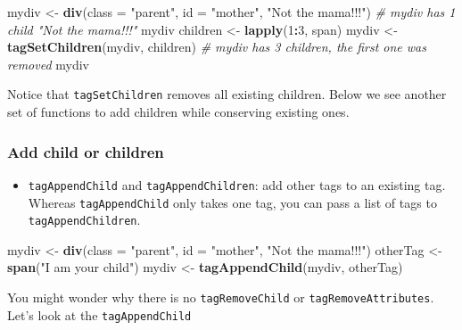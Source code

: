 \documentclass[
]{book}
\newenvironment{Shaded}{\begin{snugshade}}{\end{snugshade}}
\newcommand{\CommentTok}[1]{\textcolor[rgb]{0.56,0.35,0.01}{\textit{#1}}}
\newcommand{\DataTypeTok}[1]{\textcolor[rgb]{0.13,0.29,0.53}{#1}}
\newcommand{\DecValTok}[1]{\textcolor[rgb]{0.00,0.00,0.81}{#1}}
\newcommand{\KeywordTok}[1]{\textcolor[rgb]{0.13,0.29,0.53}{\textbf{#1}}}
\newcommand{\NormalTok}[1]{#1}
\newcommand{\OperatorTok}[1]{\textcolor[rgb]{0.81,0.36,0.00}{\textbf{#1}}}
\newcommand{\StringTok}[1]{\textcolor[rgb]{0.31,0.60,0.02}{#1}}
\providecommand{\tightlist}{%
  \setlength{\itemsep}{0pt}\setlength{\parskip}{0pt}}
\begin{document}
\begin{Shaded}
\begin{Highlighting}[]
\NormalTok{mydiv <-}\StringTok{ }\KeywordTok{div}\NormalTok{(}\DataTypeTok{class =} \StringTok{"parent"}\NormalTok{, }\DataTypeTok{id =} \StringTok{"mother"}\NormalTok{, }\StringTok{"Not the mama!!!"}\NormalTok{)}
\CommentTok{# mydiv has 1 child "Not the mama!!!"}
\NormalTok{mydiv }
\NormalTok{children <-}\StringTok{ }\KeywordTok{lapply}\NormalTok{(}\DecValTok{1}\OperatorTok{:}\DecValTok{3}\NormalTok{, span)}
\NormalTok{mydiv <-}\StringTok{ }\KeywordTok{tagSetChildren}\NormalTok{(mydiv, children)}
\CommentTok{# mydiv has 3 children, the first one was removed}
\NormalTok{mydiv }
\end{Highlighting}
\end{Shaded}

Notice that \texttt{tagSetChildren} removes all existing children. Below we see another set of functions to add children while conserving existing ones.

\hypertarget{add-child-or-children}{%
\subsubsection{Add child or children}\label{add-child-or-children}}

\begin{itemize}
\tightlist
\item
  \texttt{tagAppendChild} and \texttt{tagAppendChildren}: add other tags to an existing tag.
  Whereas \texttt{tagAppendChild} only takes one tag, you can pass a list of tags to \texttt{tagAppendChildren}.
\end{itemize}

\begin{Shaded}
\begin{Highlighting}[]
\NormalTok{mydiv <-}\StringTok{ }\KeywordTok{div}\NormalTok{(}\DataTypeTok{class =} \StringTok{"parent"}\NormalTok{, }\DataTypeTok{id =} \StringTok{"mother"}\NormalTok{, }\StringTok{"Not the mama!!!"}\NormalTok{)}
\NormalTok{otherTag <-}\StringTok{ }\KeywordTok{span}\NormalTok{(}\StringTok{"I am your child"}\NormalTok{)}
\NormalTok{mydiv <-}\StringTok{ }\KeywordTok{tagAppendChild}\NormalTok{(mydiv, otherTag)}
\end{Highlighting}
\end{Shaded}

You might wonder why there is no \texttt{tagRemoveChild} or \texttt{tagRemoveAttributes}.
Let's look at the \texttt{tagAppendChild}
\end{document}

